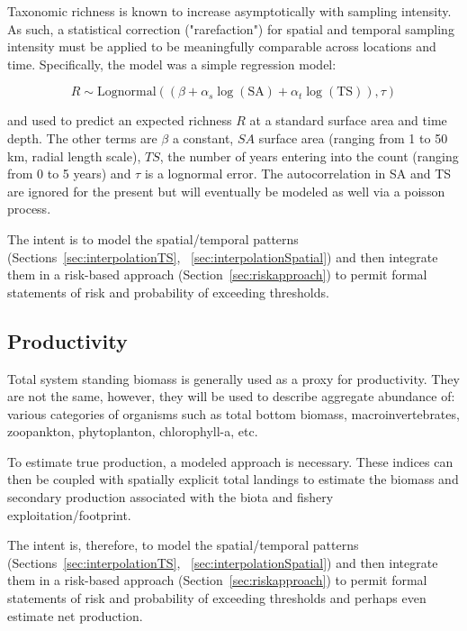 \documentclass[letterpaper,portrait,11pt]{scrartcl}
\numberwithin{equation}{section}    %
\numberwithin{figure}{section}    %
\numberwithin{table}{section}       %
\begin{document}
Taxonomic richness is known to increase asymptotically with sampling intensity. As such, a statistical correction ("rarefaction") for spatial and temporal sampling intensity must be applied to be meaningfully comparable across locations and time. Specifically, the model was a simple regression model:


\begin{equation}
  \label{eq:biodiversity}
  R \sim \text{Lognormal} ( (\beta + \alpha_s \log(\text{SA}) + \alpha_t \log(\text{TS}) ),  \tau ) 
\end{equation}


and used to predict an expected richness $R$ at a standard surface area and time depth. The other terms are $\beta$ a constant, $SA$ surface area (ranging from 1 to 50 km, radial length scale), $TS$, the number of years entering into the count (ranging from 0 to 5 years) and $\tau$ is a lognormal error. The autocorrelation in SA and TS are ignored for the present but will eventually be modeled as well via a poisson process.  

The intent is to model the spatial/temporal patterns (Sections~\ref{sec:interpolationTS}, ~\ref{sec:interpolationSpatial}) and then integrate them in a risk-based approach (Section~\ref{sec:riskapproach}) to permit formal statements of risk and probability of exceeding thresholds. 


\subsection{Productivity}

Total system standing biomass is generally used as a proxy for productivity. They are not the same, however, they will be used to describe aggregate abundance of: various categories of organisms such as total bottom biomass, macroinvertebrates, zoopankton, phytoplanton, chlorophyll-a, etc. 

To estimate true production, a modeled approach is necessary. These indices can then be coupled with spatially explicit total landings to estimate the biomass and secondary production associated with the biota and fishery exploitation/footprint. 

The intent is, therefore, to model the spatial/temporal patterns (Sections~\ref{sec:interpolationTS}, ~\ref{sec:interpolationSpatial}) and then integrate them in a risk-based approach (Section~\ref{sec:riskapproach}) to permit formal statements of risk and probability of exceeding thresholds and perhaps even estimate net production. 
\end{document}
